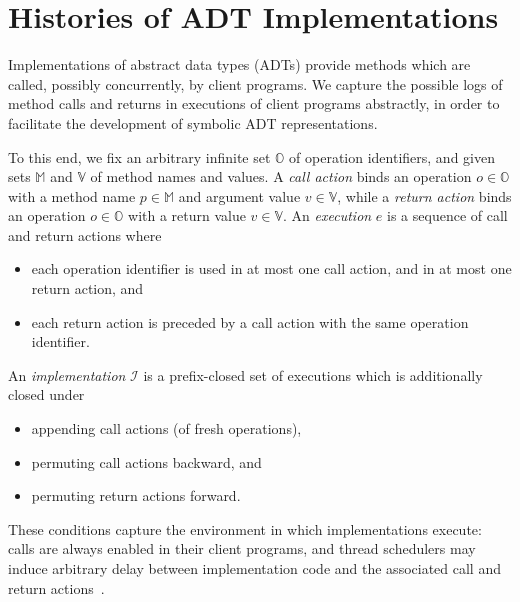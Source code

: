 \section{Histories of ADT Implementations}
\label{sec:histories}

Implementations of abstract data types (ADTs) provide methods which are called,
possibly concurrently, by client programs. We capture the possible logs of
method calls and returns in executions of client programs abstractly, in order
to facilitate the development of symbolic ADT representations.

To this end, we fix an arbitrary infinite set $\mathbb{O}$ of operation
identifiers, and given sets $\mathbb{M}$ and $\mathbb{V}$ of method names and
values. A \emph{call action} binds an operation $o \in \mathbb{O}$ with a
method name $p \in \mathbb{M}$ and argument value $v \in \mathbb{V}$, while a
\emph{return action} binds an operation $o \in \mathbb{O}$ with a return value
$v \in \mathbb{V}$. An \emph{execution} $e$ is a sequence of call and return
actions where
\begin{itemize}

  \item each operation identifier is used in at most one call action, and in at
  most one return action, and

  \item each return action is preceded by a call action with the same operation
  identifier.

\end{itemize}
An \emph{implementation} $\mathcal{I}$ is a prefix-closed set of executions
which is additionally closed under
\begin{itemize}

  \item appending call actions (of fresh operations),

  \item permuting call actions backward, and

  \item permuting return actions forward.

\end{itemize}
These conditions capture the environment in which implementations execute:
calls are always enabled in their client programs, and thread schedulers may
induce arbitrary delay between implementation code and the associated call and
return actions~\cite{conf/popl/BouajjaniEEH15}.

